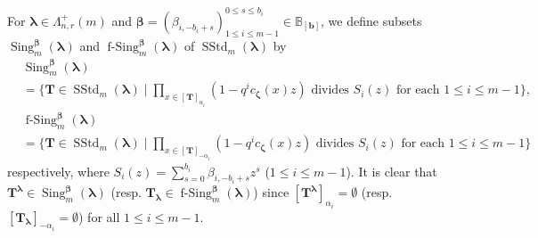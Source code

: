\documentclass[12pt]{amsart}
\numberwithin{equation}{thm}
\newcommand\BB{\mathbb B}
\newcommand\bT{\mathbf T}
\newcommand\bb{\mathbf b}
\renewcommand\a{\alpha}  %
\renewcommand\b{\beta}   %
\newcommand\vL{\varLambda}
\newcommand\Bb{\boldsymbol\beta}
\newcommand\Bz{\boldsymbol\zeta}
\newcommand\Bla{\boldsymbol\lambda}
\newcommand{\SStd}{\operatorname{SStd}}
\newcommand{\Sing}{\operatorname{Sing}}
\newcommand{\fSing}{\operatorname{f-Sing}}
\begin{document}
For $\Bla \in \vL_{n,r}^+(m)$ and  $\Bb = (\b_{i, - b_i +s})_{1 \leq i \leq m-1}^{0 \leq s \leq b_i}\in \BB_{[\bb]}$, 
we define subsets  
$\Sing_m^{\Bb} (\Bla)$ and $\fSing_m^{\Bb} (\Bla)$  of $\SStd_m (\Bla)$ by 
\begin{align*}
&\Sing_m^{\Bb} (\Bla) 
\\
&= \{ \bT\in \SStd_m(\Bla) \mid 
	\prod_{x \in [\bT]_{\a_i}}  (1 - q^i c_{\Bz} (x) z)  \text{ divides } S_i(z)  \text{ for each }  1 \leq i \leq m-1  \}, 
\\
&\fSing_m^{\Bb} (\Bla) 
\\
&= \{ \bT\in \SStd_m(\Bla) \mid 
	\prod_{x \in [\bT]_{-\a_i}} (1 - q^i c_{\Bz} (x) z)  \text{ divides } S_i(z)  \text{ for each }  1 \leq i \leq m-1 \} 
\end{align*}
respectively, 
where 
$S_i(z) = \sum_{s=0}^{b_i} \b_{i, - b_i +s} z^s$ ($1 \leq i \leq m-1$). 
It is clear that $\bT^{\Bla} \in \Sing_m^{\Bb} (\Bla)$ (resp. $\bT_{\Bla} \in \fSing_m^{\Bb} (\Bla)$) 
since $[\bT^{\Bla}]_{\a_i} =\emptyset$ (resp. $[\bT_{\Bla}]_{-\a_i} = \emptyset$) for all $1 \leq i \leq m-1$. 
\end{document}
